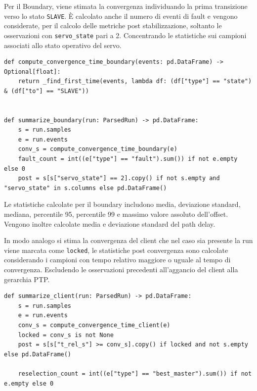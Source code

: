 Per il Boundary, viene stimata la convergenza individuando la prima
transizione verso lo stato \texttt{SLAVE}. È calcolato anche  il numero di
eventi di fault e vengono considerate, per il calcolo delle metriche post
stabilizzazione, soltanto le osservazioni con \texttt{servo\_state} pari a 2.
Concentrando le statistiche sui campioni associati allo stato operativo del servo.

\begin{listing}[H]
\begin{verbatim}
def compute_convergence_time_boundary(events: pd.DataFrame) -> Optional[float]:
    return _find_first_time(events, lambda df: (df["type"] == "state") & (df["to"] == "SLAVE"))


def summarize_boundary(run: ParsedRun) -> pd.DataFrame:
    s = run.samples
    e = run.events
    conv_s = compute_convergence_time_boundary(e)
    fault_count = int((e["type"] == "fault").sum()) if not e.empty else 0
    post = s[s["servo_state"] == 2].copy() if not s.empty and "servo_state" in s.columns else pd.DataFrame()
\end{verbatim}
\caption{Criterio di convergenza e selezione dei campioni post-stabilizzazione per il boundary PTP.}
\label{lst:ptp-boundary-summary}
\end{listing}

Le statistiche calcolate per il boundary includono media, deviazione standard,
mediana, percentile 95, percentile 99 e massimo valore assoluto dell'offset.
Vengono inoltre calcolate media e deviazione standard del path delay.

In modo analogo si stima la convergenza del client che nel caso sia presente
la run viene marcata come \texttt{locked}, le statistiche post convergenza sono
calcolate considerando i campioni con tempo relativo maggiore o uguale al tempo
di convergenza. Escludendo le osservazioni precedenti all'aggancio del client 
alla gerarchia PTP.

\begin{listing}[H]
\begin{verbatim}
def summarize_client(run: ParsedRun) -> pd.DataFrame:
    s = run.samples
    e = run.events
    conv_s = compute_convergence_time_client(e)
    locked = conv_s is not None
    post = s[s["t_rel_s"] >= conv_s].copy() if locked and not s.empty else pd.DataFrame()

    reselection_count = int((e["type"] == "best_master").sum()) if not e.empty else 0
\end{verbatim}
\caption{Selezione dei campioni post-convergenza per il client PTP.}
\label{lst:ptp-client-summary}
\end{listing}

